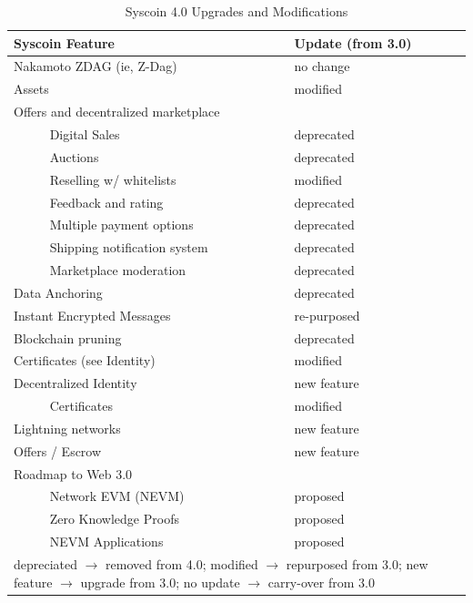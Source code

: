 \documentclass[peerreview]{ieeesyscoin}
\begin{document}
\begin{table}[h!]
\caption{Syscoin 4.0 Upgrades and Modifications}
\label{table:ugrades}
\setlength{\tabcolsep}{3pt}
\begin{tabular}{|p{135pt}|p{75pt}|}
\hline
Syscoin Feature & 
Update (from 3.0) \\

\hline
Nakamoto ZDAG (ie, Z-Dag) & no change \\
Assets & modified \\

Offers and decentralized marketplace &   \\
~~~~~ Digital Sales &  deprecated \\
~~~~~ Auctions &  deprecated \\
~~~~~ Reselling w/ whitelists &  modified \\
~~~~~ Feedback and rating &  deprecated \\
~~~~~ Multiple payment options &  deprecated \\
~~~~~ Shipping notification system &  deprecated \\
~~~~~ Marketplace moderation &  deprecated \\

Data Anchoring &  deprecated \\
Instant Encrypted Messages &  re-purposed \\
Blockchain pruning &  deprecated \\
Certificates (see Identity) &  modified \\
Decentralized Identity &  new feature \\
~~~~~ Certificates &  modified \\
Lightning networks &  new feature \\
Offers / Escrow &  new feature\\
Roadmap to Web 3.0 & \\
~~~~~ Network EVM (NEVM) &  proposed  \\
~~~~~ Zero Knowledge Proofs &  proposed \\
~~~~~ NEVM Applications &  proposed \\

\hline
\multicolumn{2}{p{251pt}}{depreciated  $\rightarrow$ removed from 4.0; modified  $\rightarrow$ repurposed from 3.0; new feature  $\rightarrow$ upgrade from 3.0; no update $\rightarrow$ carry-over from 3.0}\\

\end{tabular}
\label{tab1}
\end{table}
\end{document}
